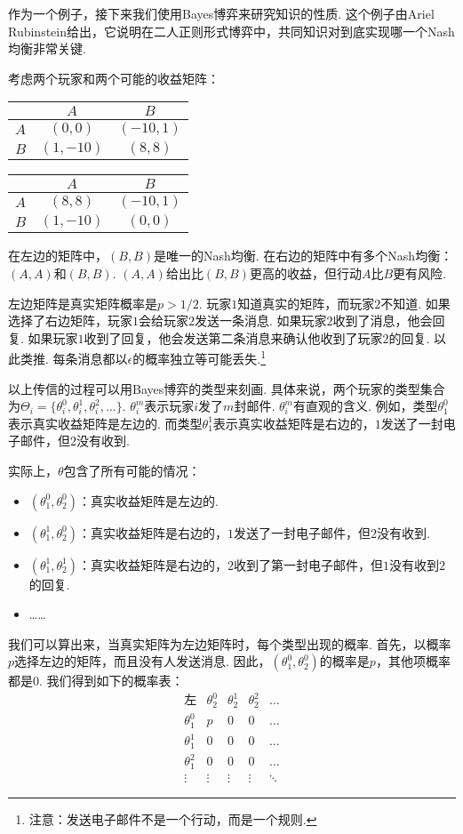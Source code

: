 作为一个例子，接下来我们使用Bayes博弈来研究知识的性质. 这个例子由Ariel Rubinstein给出，它说明在二人正则形式博弈中，共同知识对到底实现哪一个Nash均衡非常关键.

考虑两个玩家和两个可能的收益矩阵：
\begin{table}[ht]
    \centering
\begin{tabular}{c|cc}
&$A$ & $B$ \\
\hline
$A$ & $(0, 0)$ & $(-10, 1)$ \\
$B$ & $(1, -10)$ & $(8, 8)$ \\
\end{tabular}
\qquad
\begin{tabular}{c|cc}
&$A$ & $B$ \\
\hline
$A$ & $(8, 8)$ & $(-10, 1)$ \\
$B$ & $(1, -10)$ & $(0, 0)$ \\
\end{tabular}
\end{table}

在左边的矩阵中，$(B,B)$是唯一的Nash均衡. 在右边的矩阵中有多个Nash均衡：$(A,A)$和$(B,B)$. $(A,A)$给出比$(B,B)$更高的收益，但行动$A$比$B$更有风险.

左边矩阵是真实矩阵概率是$p>1/2$. 玩家$1$知道真实的矩阵，而玩家$2$不知道. 如果选择了右边矩阵，玩家$1$会给玩家$2$发送一条消息. 如果玩家$2$收到了消息，他会回复. 如果玩家$1$收到了回复，他会发送第二条消息来确认他收到了玩家$2$的回复. 以此类推.  每条消息都以$\epsilon$的概率独立等可能丢失.\footnote{注意：发送电子邮件不是一个行动，而是一个规则.}  

以上传信的过程可以用Bayes博弈的类型来刻画. 具体来说，两个玩家的类型集合为$\Theta_i = \{\theta_i^0, \theta_i^1, \theta_i^2, \dots\}$. $\theta_i^m$表示玩家$i$发了$m$封邮件. $\theta_i^m$有直观的含义. 例如，类型$\theta_1^0$表示真实收益矩阵是左边的.  而类型$\theta_1^1$表示真实收益矩阵是右边的，$1$发送了一封电子邮件，但$2$没有收到. 

实际上，$\theta$包含了所有可能的情况：
\begin{itemize}
\item $(\theta_1^0, \theta_2^0)$：真实收益矩阵是左边的. 
\item $(\theta_1^1, \theta_2^0)$：真实收益矩阵是右边的，$1$发送了一封电子邮件，但$2$没有收到. 
\item $(\theta_1^1, \theta_2^1)$：真实收益矩阵是右边的，$2$收到了第一封电子邮件，但$1$没有收到$2$的回复. 
\item ……
\end{itemize}

我们可以算出来，当真实矩阵为左边矩阵时，每个类型出现的概率. 首先，以概率$p$选择左边的矩阵，而且没有人发送消息. 因此，$(\theta_1^0,\theta_2^0)$的概率是$p$，其他项概率都是$0$. 我们得到如下的概率表：
\[\begin{array}{c|cccc}
\text{左}& \theta_2^0 & \theta_2^1 & \theta_2^2 & \dots \\
\hline
\theta_1^0 & p & 0 & 0 & \dots \\
\theta_1^1 & 0 & 0 & 0 & \dots \\
\theta_1^2 & 0 & 0 & 0 & \dots \\
\vdots & \vdots & \vdots & \vdots & \ddots
\end{array}
\]

